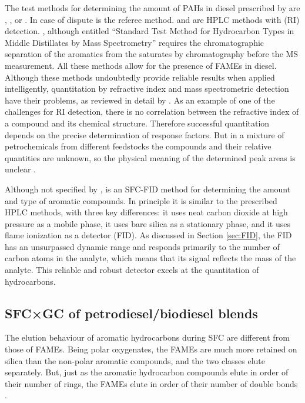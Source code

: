 The test methods for determining the amount of PAHs in diesel prescribed by
 are , , or . In case of
dispute  is the referee method.  and  
are HPLC methods with  (RI) detection. ,
although entitled ``Standard Test Method for Hydrocarbon Types in Middle
Distillates by Mass Spectrometry'' requires the chromatographic separation of
the aromatics from the saturates by chromatography before the MS measurement.
All these methods allow for the presence of FAMEs in diesel.
Although these methods undoubtedly provide reliable results when applied
intelligently, quantitation by refractive index and mass spectrometric detection
have their problems, as reviewed in detail by \cite{Kaminski2005}.
As an example of one of the challenges for RI detection, there is no correlation
between the refractive index of a compound and its chemical structure. Therefore
successful quantitation depends on the precise determination of response
factors. But in a mixture of petrochemicals from different feedstocks the
compounds and their relative quantities are unknown, so the physical meaning of
the determined peak areas is unclear \autocite{Sarowha2000}.

Although not specified by ,  is an SFC-FID method
for determining the amount and type of aromatic compounds. In principle it is
similar to the prescribed HPLC methods, with three key differences: it uses neat
carbon dioxide at high pressure as a mobile phase, it uses bare silica as a
stationary phase, and it uses flame ionization as a detector (FID). As discussed
in Section \ref{sec:FID}, the FID has an unsurpassed dynamic range and responds
primarily to the number of carbon atoms in the analyte, which means that its
signal reflects the mass of the analyte. This reliable and robust detector
excels at the quantitation of hydrocarbons.

\subsection{SFC×GC of petrodiesel/biodiesel blends}

The elution behaviour of aromatic hydrocarbons during SFC are different from
those of FAMEs. Being polar oxygenates, the FAMEs are much more retained on
silica than the non-polar aromatic compounds, and the two classes elute
separately. But, just as the aromatic hydrocarbon compounds elute in order of
their number of rings, the FAMEs elute in order of their number of double bonds
\autocite{Smith2001}.

